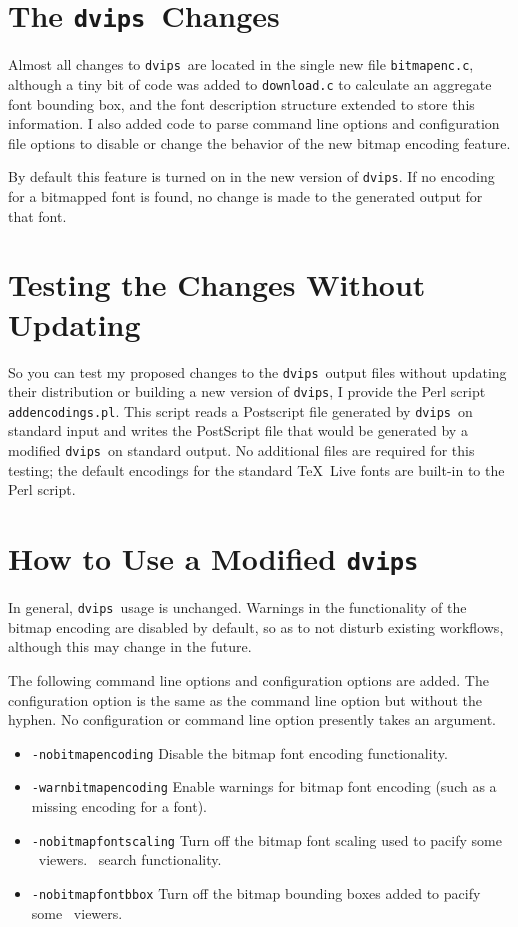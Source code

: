 \documentclass{ltugboat}
\def\PDF{\acro{PDF}}
\def\dvips{\texttt{dvips}}
\begin{document}
\section{The \dvips\ Changes}

Almost all changes to \dvips\ are located in the single new
file \texttt{bitmapenc.c}, although a tiny bit of code was
added to \texttt{download.c} to calculate an aggregate font
bounding box, and the font description structure extended to
store this information.  I also added code to parse command
line options and configuration file options to disable or
change the behavior of the new bitmap encoding feature.

By default this feature is turned on in the new version of
\dvips.  If no encoding for a bitmapped font is found, no
change is made to the generated output for that font.

\section{Testing the Changes Without Updating}

So you can test my proposed changes to the \dvips\ output
files without updating their distribution or building a new
version of \dvips, I provide the Perl script
\texttt{addencodings.pl}.
This script reads a Postscript file generated by \dvips\ on
standard input and writes the PostScript file that would be
generated by a modified \dvips\ on standard output.  No
additional files are required for this testing; the default
encodings for the standard \TeX\ Live fonts are built-in to
the Perl script.

\section{How to Use a Modified \dvips}

In general, \dvips\ usage is unchanged.  Warnings in
the functionality of the bitmap encoding are disabled by default,
so as to not disturb existing workflows, although this may
change in the future.

The following command line options and configuration options are
added.  The configuration option is the same as the command line
option but without the hyphen.  No configuration or command line
option presently takes an argument.

\begin{itemize}
\item \texttt{-nobitmapencoding} Disable the bitmap font encoding
functionality.
\item \texttt{-warnbitmapencoding} Enable warnings for bitmap font
encoding (such as a missing encoding for a font).
\item \texttt{-nobitmapfontscaling} Turn off the bitmap font
scaling used to pacify some \PDF\ viewers.
\PDF\ search functionality.
\item \texttt{-nobitmapfontbbox} Turn off the bitmap bounding
boxes added to pacify some \PDF\ viewers.
\end{itemize}
\end{document}
